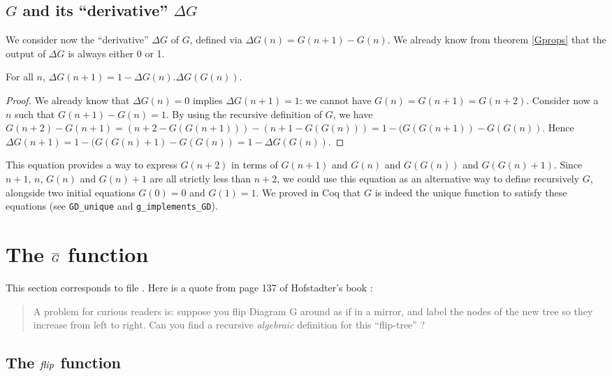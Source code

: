 \documentclass[a4paper,11pt]{article}
\begin{document}
\subsection{$G$ and its ``derivative'' $\Delta G$}
\label{deltaG}

We consider now the ``derivative'' $\Delta G$ of $G$, defined via
$\Delta G(n) = G(n+1)-G(n)$. We already know from theorem
\ref{Gprops} that the output of $\Delta G$ is always either 0 or 1.

\begin{theorem}\label{Gdelta}
For all $n$, $\Delta G(n+1) = 1 - \Delta G(n).\Delta G(G(n))$.
\end{theorem}
\begin{proof}
We already know that $\Delta G(n)=0$ implies $\Delta G(n+1)=1$:
we cannot have $G(n)=G(n+1)=G(n+2)$.
Consider now a $n$ such that
$G(n+1)-G(n)=1$. By using the recursive definition of $G$, we have
$G(n+2)-G(n+1)=(n+2-G(G(n+1)))-(n+1-G(G(n))) = 1 - (G(G(n+1))-G(G(n))$.
Hence $\Delta G(n+1) = 1 - (G(G(n)+1)-G(G(n)) = 1 - \Delta G(G(n))$.
\end{proof}

This equation provides a way to express $G(n+2)$ in terms of
$G(n+1)$ and $G(n)$ and $G(G(n))$ and $G(G(n)+1)$. Since
$n+1$, $n$, $G(n)$ and $G(n)+1$ are all strictly less than $n+2$,
we could use this equation as an alternative way to define
recursively $G$,
alongside two initial equations $G(0)=0$ and $G(1)=1$.
We proved in Coq that $G$ is indeed the unique function to
satisfy these equations (see {\tt GD\_unique} and
{\tt  g\_implements\_GD}).

\section{The $\overline{G}$ function}

This section corresponds to file .
Here is a quote from page 137 of Hofstadter's book \cite{GEB}:
\begin{quote}
A problem for curious readers is: suppose you flip Diagram G
around as if in a mirror, and label the nodes of the new tree so they
increase from left to right. Can you find a recursive \emph{algebraic}
definition for this ``flip-tree'' ?
\end{quote}

\subsection{The $\textit{flip}$ function}
\end{document}
